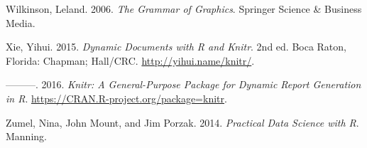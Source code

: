 \documentclass[12pt,]{book}
\begin{document}
\hypertarget{ref-wilkinson2006grammar}{}
Wilkinson, Leland. 2006. \emph{The Grammar of Graphics}. Springer
Science \& Business Media.

\hypertarget{ref-xie2015}{}
Xie, Yihui. 2015. \emph{Dynamic Documents with R and Knitr}. 2nd ed.
Boca Raton, Florida: Chapman; Hall/CRC. \url{http://yihui.name/knitr/}.

\hypertarget{ref-R-knitr}{}
---------. 2016. \emph{Knitr: A General-Purpose Package for Dynamic
Report Generation in R}. \url{https://CRAN.R-project.org/package=knitr}.

\hypertarget{ref-zumel2014practical}{}
Zumel, Nina, John Mount, and Jim Porzak. 2014. \emph{Practical Data
Science with R}. Manning.
\end{document}
